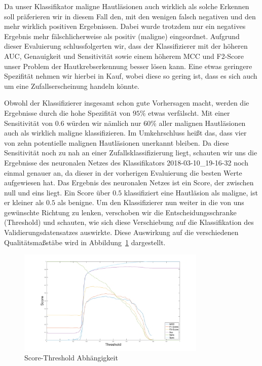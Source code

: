 Da unser Klassifikator maligne Hautläsionen auch wirklich als solche Erkennen soll präferieren wir in diesem Fall den, mit den wenigen falsch negativen und den mehr wirklich positiven Ergebnissen. Dabei wurde trotzdem nur ein negatives Ergebnis mehr fälschlicherweise als positiv (maligne) eingeordnet. Aufgrund dieser Evaluierung schlussfolgerten wir, dass der Klassifizierer mit der höheren AUC, Genauigkeit und Sensitivität sowie einem  höherem MCC und F2-Score unser Problem der Hautkrebserkennung besser lösen kann. Eine etwas geringere Spezifität nehmen wir hierbei in Kauf, wobei diese so gering ist, dass es sich auch um eine Zufallserscheinung handeln könnte.
 
Obwohl der Klassifizierer insgesamt schon gute Vorhersagen macht, werden die Ergebnisse durch die hohe Spezifität von $95\%$ etwas verfälscht. Mit einer Sensitivität von $0.6$ würden wir nämlich nur $60\%$ aller malignen Hautläsionen auch als wirklich maligne klassifizieren. Im Umkehrschluss heißt das, dass vier von zehn potentielle malignen Hautläsionen unerkannt bleiben. Da diese Sensitivität noch zu nah an einer Zufallsklassifizierung liegt, schauten wir uns die Ergebnisse des neuronalen Netzes des Klassifikators 2018-03-10\_19-16-32 noch einmal genauer an, da dieser in der vorherigen Evaluierung die besten Werte aufgewiesen hat. Das Ergebnis des neuronalen Netzes ist ein Score, der zwischen null und eins liegt. Ein Score über $0.5$ klassifiziert eine Hautläsion als maligne, ist er kleiner als $0.5$ als benigne. Um den Klassifizierer nun weiter in die von uns gewünschte Richtung zu lenken, verschoben wir die Entscheidungsschranke (Threshold) und schauten, wie sich diese Verschiebung auf die Klassifikation des Validierungsdatensatzes auswirkte. Diese Auswirkung auf die verschiedenen Qualitätsmaßstäbe wird in Abbildung~\ref{fig:threshold} dargestellt. 

\begin{figure}[htb!]
	\begin{center}
		\includegraphics[width=0.8\textwidth]{pics/evaluation/treshold.png}
		\caption{Score-Threshold Abhängigkeit}
		\label{fig:threshold}
    \end{center}
\end{figure}

